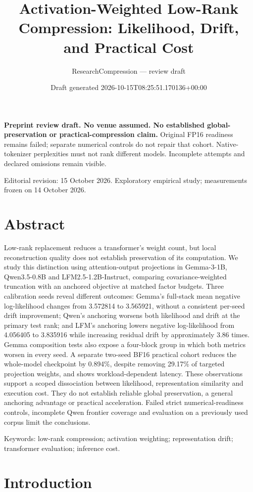 \documentclass[10pt]{article}
\title{Activation-Weighted Low-Rank Compression: Likelihood, Drift, and Practical Cost}
\author{ResearchCompression --- review draft}
\date{Draft generated 2026-10-15T08:25:51.170136+00:00}
\begin{document}
\maketitle
\noindent\textbf{Preprint review draft. No venue assumed. No established global-preservation or practical-compression claim.}
Original FP16 readiness remains failed; separate numerical controls do not repair that cohort. Native-tokenizer perplexities must not rank different models. Incomplete attempts and declared omissions remain visible.


Editorial revision: 15 October 2026. Exploratory empirical study; measurements frozen on 14 October 2026.

\section{Abstract}

Low-rank replacement reduces a transformer's weight count, but local reconstruction quality does not establish preservation of its computation. We study this distinction using attention-output projections in Gemma-3-1B, Qwen3.5-0.8B and LFM2.5-1.2B-Instruct, comparing covariance-weighted truncation with an anchored objective at matched factor budgets. Three calibration seeds reveal different outcomes: Gemma's full-stack mean negative log-likelihood changes from 3.572814 to 3.565921, without a consistent per-seed drift improvement; Qwen's anchoring worsens both likelihood and drift at the primary test rank; and LFM's anchoring lowers negative log-likelihood from 4.056405 to 3.835916 while increasing residual drift by approximately 3.86 times. Gemma composition tests also expose a four-block group in which both metrics worsen in every seed. A separate two-seed BF16 practical cohort reduces the whole-model checkpoint by 0.894\%, despite removing 29.17\% of targeted projection weights, and shows workload-dependent latency. These observations support a scoped dissociation between likelihood, representation similarity and execution cost. They do not establish reliable global preservation, a general anchoring advantage or practical acceleration. Failed strict numerical-readiness controls, incomplete Qwen frontier coverage and evaluation on a previously used corpus limit the conclusions.

Keywords: low-rank compression; activation weighting; representation drift; transformer evaluation; inference cost.

\section{Introduction}
\end{document}

